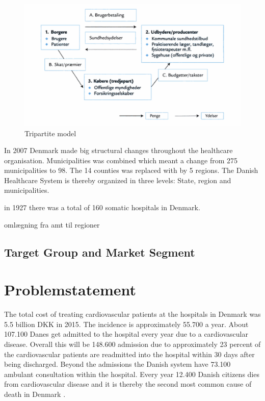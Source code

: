 \begin{figure}[H]
\centering
\includegraphics[width=1\textwidth]{Figure/tredjepart.png}
\caption{Tripartite model \cite{sundhedsvaesen}}
\label{Trepartmodel}
\end{figure} 

In 2007 Denmark made big structural changes throughout the healthcare organisation. Municipalities was combined which meant a change from 275 municipalities to 98. The 14 counties was replaced with by 5 regions. The Danish Healthcare System is thereby organized in three levels: State, region and municipalities.

 in 1927 there was a total of 160 somatic hospitals in Denmark. 



omlægning fra amt til regioner
\cite{sundhedsvaesen}
\subsection{Target Group and Market Segment}


\section{Problemstatement}
The total cost of treating cardiovascular patients at the hospitals in Denmark was 5.5 billion DKK in 2015. The incidence is approximately 55.700 a year. About 107.100 Danes get admitted to the hospital every year due to a cardiovascular disease. Overall this will be 148.600 admission due to approximately 23 percent of the cardiovascular patients are readmitted into the hospital within 30 days after being discharged. Beyond the admissions the Danish system have 73.100 ambulant consultation within the hospital. Every year 12.400 Danish citizens dies from cardiovascular disease and it is thereby the second most common cause of death in Denmark . 

